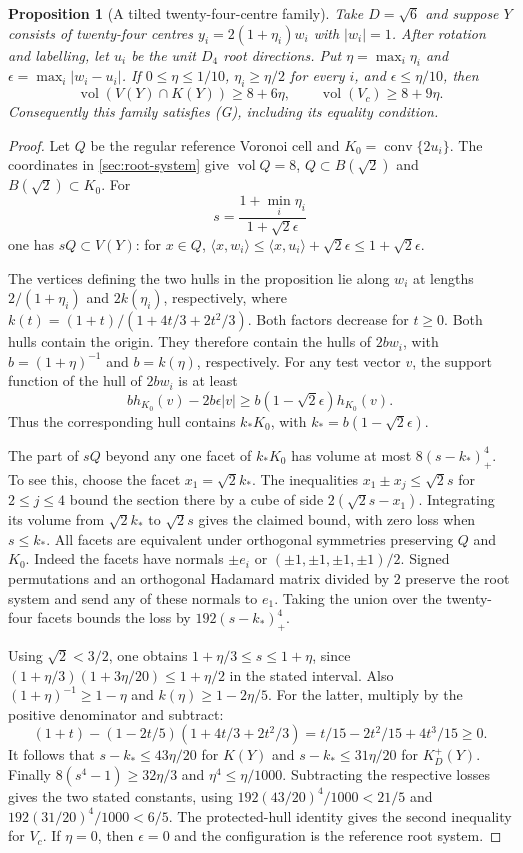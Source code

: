 \documentclass[11pt,reqno]{amsart}
\renewcommand{\_}{\origunderscore\allowbreak}
\numberwithin{equation}{section}
\theoremstyle{plain}
\newtheorem{prop}[thm]{Proposition}
\theoremstyle{definition}
\theoremstyle{remark}
\DeclareMathOperator{\vol}{vol}
\begin{document}
\begin{prop}[A tilted twenty-four-centre family]\label{prop:protected-tilt}
Take $D=\sqrt6$ and suppose $Y$ consists of twenty-four centres
$y_i=2(1+\eta_i)w_i$ with $|w_i|=1$. After rotation and labelling,
let $u_i$ be the unit $D_4$ root directions. Put
$\eta=\max_i\eta_i$ and $\epsilon=\max_i|w_i-u_i|$.
If $0\le\eta\le1/10$, $\eta_i\ge\eta/2$ for every $i$, and
$\epsilon\le\eta/10$, then
\[
 \vol(V(Y)\cap K(Y))\ge 8+6\eta,
 \qquad \vol(V_c)\ge8+9\eta.
\]
Consequently this family satisfies (G), including its equality condition.
\end{prop}
\begin{proof}
Let $Q$ be the regular reference Voronoi cell and
$K_0=\operatorname{conv}\{2u_i\}$. The coordinates in
\cref{sec:root-system} give $\vol Q=8$, $Q\subset B(\sqrt2)$
and $B(\sqrt2)\subset K_0$. For
\[
 s=\frac{1+\min_i\eta_i}{1+\sqrt2\epsilon}
\]
one has $sQ\subset V(Y)$: for $x\in Q$,
$\langle x,w_i\rangle\le\langle x,u_i\rangle+\sqrt2\epsilon
\le1+\sqrt2\epsilon$.

The vertices defining the two hulls in the proposition lie along
$w_i$ at lengths $2/(1+\eta_i)$ and $2k(\eta_i)$, respectively,
where $k(t)=(1+t)/(1+4t/3+2t^2/3)$. Both factors decrease for
$t\ge0$. Both hulls contain the origin. They therefore contain
the hulls of $2b w_i$, with $b=(1+\eta)^{-1}$ and $b=k(\eta)$,
respectively. For any test vector $v$, the support function of
the hull of $2b w_i$ is at least
\[
 b h_{K_0}(v)-2b\epsilon |v|
 \ge b(1-\sqrt2\epsilon)h_{K_0}(v).
\]
Thus the corresponding hull contains $k_*K_0$, with
$k_*=b(1-\sqrt2\epsilon)$.

The part of $sQ$ beyond any one facet of $k_*K_0$ has volume at
most $8(s-k_*)_+^4$. To see this, choose the facet $x_1=\sqrt2 k_*$.
The inequalities $x_1\pm x_j\le\sqrt2 s$ for $2\le j\le4$
bound the section there by a cube of side $2(\sqrt2 s-x_1)$.
Integrating its volume from $\sqrt2 k_*$ to $\sqrt2 s$ gives the
claimed bound, with zero loss when $s\le k_*$. All facets are
equivalent under orthogonal symmetries preserving $Q$ and $K_0$.
Indeed the facets have normals $\pm e_i$ or
$(\pm1,\pm1,\pm1,\pm1)/2$. Signed permutations and an orthogonal
Hadamard matrix divided by $2$ preserve the root system and send
any of these normals to $e_1$. Taking the union over the twenty-four
facets bounds the loss by $192(s-k_*)_+^4$.

Using $\sqrt2<3/2$, one obtains $1+\eta/3\le s\le1+\eta$,
since $(1+\eta/3)(1+3\eta/20)\le1+\eta/2$ in the stated interval.
Also $(1+\eta)^{-1}\ge1-\eta$ and $k(\eta)\ge1-2\eta/5$.
For the latter, multiply by the positive denominator and subtract:
\[
 (1+t)-(1-2t/5)(1+4t/3+2t^2/3)
 =t/15-2t^2/15+4t^3/15\ge0.
\]
It follows that $s-k_*\le43\eta/20$ for $K(Y)$ and
$s-k_*\le31\eta/20$ for $K_D^+(Y)$. Finally
$8(s^4-1)\ge32\eta/3$ and $\eta^4\le\eta/1000$.
Subtracting the respective losses gives the two stated constants,
using $192(43/20)^4/1000<21/5$ and
$192(31/20)^4/1000<6/5$. The protected-hull identity gives the
second inequality for $V_c$. If $\eta=0$, then $\epsilon=0$ and
the configuration is the reference root system.
\end{proof}
\end{document}
